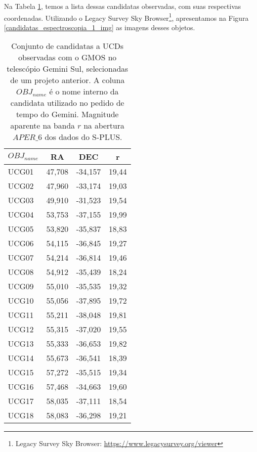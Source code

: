 Na Tabela \ref{candidatas_espectroscopia_1}, temos a lista dessas candidatas observadas, com suas respectivas coordenadas. Utilizando o Legacy Survey Sky Browser\footnote{Legacy Survey Sky Browser: \url{https://www.legacysurvey.org/viewer}}, apresentamos na Figura \ref{candidatas_espectroscopia_1_img} as imagens desses objetos.

\begin{table}[!ht]
    \centering
    \caption{Conjunto de candidatas a UCDs observadas com o GMOS no telescópio Gemini Sul, selecionadas de um projeto anterior. A coluna $OBJ_{name}$ é o nome interno da candidata utilizado no pedido de tempo do Gemini. Magnitude aparente na banda $r$ na abertura $APER\_6$ dos dados do S-PLUS. } 
    \begin{tabular}{lccc}
        \toprule
        $OBJ_{name}$ & RA     & DEC & r \\
        \midrule
        UCG01     & 47,708 & -34,157 & 19,44\\
        UCG02     & 47,960 & -33,174 & 19,03\\
        UCG03     & 49,910 & -31,523 & 19,54\\
        UCG04     & 53,753 & -37,155 & 19,99\\
        UCG05     & 53,820 & -35,837 & 18,83\\
        UCG06     & 54,115 & -36,845 & 19,27\\
        UCG07     & 54,214 & -36,814 & 19,46\\
        UCG08     & 54,912 & -35,439 & 18,24\\
        UCG09     & 55,010 & -35,535 & 19,32\\
        UCG10     & 55,056 & -37,895 & 19,72\\
        UCG11     & 55,211 & -38,048 & 19,81\\
        UCG12     & 55,315 & -37,020 & 19,55\\
        UCG13     & 55,333 & -36,653 & 19,82\\
        UCG14     & 55,673 & -36,541 & 18,39\\
        UCG15     & 57,272 & -35,515 & 19,34\\
        UCG16     & 57,468 & -34,663 & 19,60\\
        UCG17     & 58,035 & -37,111 & 18,54\\
        UCG18     & 58,083 & -36,298 & 19,21\\
        \bottomrule
    \end{tabular}
    \label{candidatas_espectroscopia_1}
\end{table}


